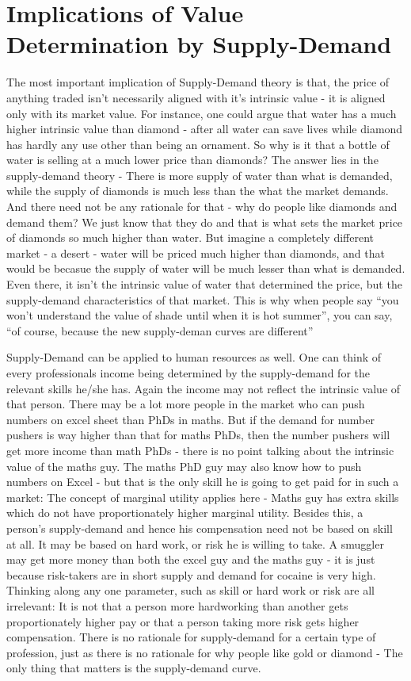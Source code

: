 \section{Implications of Value Determination by Supply-Demand}
The most important implication of Supply-Demand theory is that, the price of anything traded isn't necessarily aligned with it's intrinsic value - it is aligned only with its market value. For instance, one could argue that water has a much higher intrinsic value than diamond - after all water can save lives while diamond has hardly any use other than being an ornament. So why is it that a bottle of water is selling at a much lower price than diamonds? The answer lies in the supply-demand theory - There is more supply of water than what is demanded, while the supply of diamonds is much less than the what the market demands. And there need not be any rationale for that - why do people like diamonds and demand them? We just know that they do and that is what sets the market price of diamonds so much higher than water. But imagine a completely different market - a desert - water will be priced much higher than diamonds, and that would be becasue the supply of water will be much lesser than what is demanded. Even there, it isn't the intrinsic value of water that determined the price, but the supply-demand characteristics of that market. This is why when people say ``you won't understand the value of shade until when it is hot summer'', you can say, ``of course, because the new supply-deman curves are different''

Supply-Demand can be applied to human resources as well. One can think of every professionals income being determined by the supply-demand for the relevant skills he/she has. Again the income may not reflect the intrinsic value of that person. There may be a lot more people in the market who can push numbers on excel sheet than PhDs in maths. But if the demand for number pushers is way higher than that for maths PhDs, then the number pushers will get more income than math PhDs - there is no point talking about the intrinsic value of the maths guy. The maths PhD guy may also know how to push numbers on Excel - but that is the only skill he is going to get paid for in such a market: The concept of marginal utility applies here - Maths guy has extra skills which do not have proportionately higher marginal utility. Besides this, a person's supply-demand and hence his compensation need not be based on skill at all. It may be based on hard work, or risk he is willing to take. A smuggler may get more money than both the excel guy and the maths guy - it is just because risk-takers are in short supply and demand for cocaine is very high. Thinking along any one parameter, such as skill or hard work or risk are all irrelevant: It is not that a person more hardworking than another gets proportionately higher pay or that a person taking more risk gets  higher compensation. There is no rationale for supply-demand for a certain type of profession, just as there is no rationale for why people like gold or diamond - The only thing that matters is the supply-demand curve.




